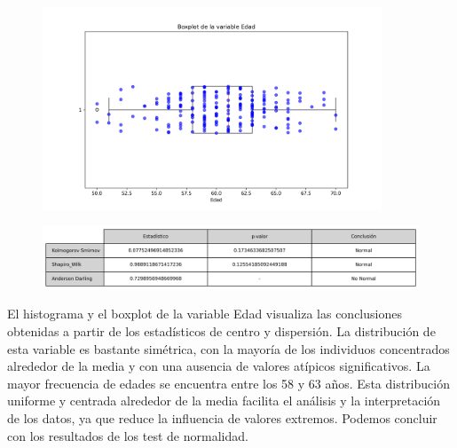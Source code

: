 \documentclass[a4paper, 12pt]{article}
\begin{document}
\vspace {-1cm}
\begin{figure}[H]
    \centering
    \includegraphics[width=0.9\textwidth]{img/Boxplot/Boxplt_Edad.png}
\end{figure}

\begin{figure}[H]
    \centering
    \includegraphics[width=1\textwidth]{img/Tablas/test_normalidad_Edad.png}
\end{figure}


El histograma y el boxplot de la variable Edad visualiza las conclusiones obtenidas a partir de los estadísticos de centro y 
dispersión. La distribución de esta variable es bastante simétrica, con la mayoría de los individuos concentrados alrededor 
de la media y con una ausencia de valores atípicos significativos. La mayor frecuencia de edades se encuentra entre los 58 y 63 años. Esta distribución uniforme y centrada alrededor de la media 
facilita el análisis y la interpretación de los datos, ya que reduce la influencia de valores extremos. Podemos concluir con los resultados de los test de normalidad.
\end{document}

